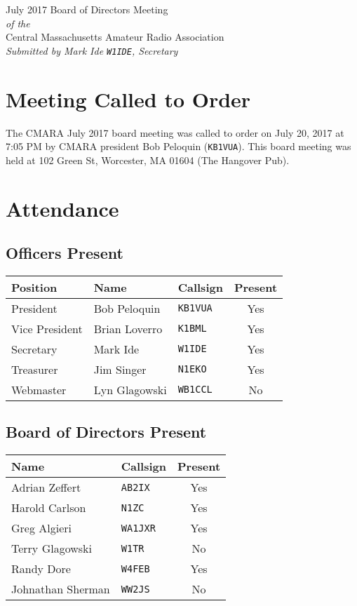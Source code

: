 \documentclass[10pt,letterpaper]{article}
\begin{document}
\begin{center}
{\huge July 2017 Board of Directors Meeting}\\
\emph{of the}\\
{\Large Central Massachusetts Amateur Radio Association}\\
\emph{Submitted by Mark Ide \texttt{W1IDE}, Secretary}
\end{center}

\section{Meeting Called to Order}
The CMARA July 2017 board meeting was called to order on July 20, 2017 at 7:05 PM by CMARA president Bob Peloquin (\texttt{KB1VUA}). This board meeting was held at 102 Green St, Worcester, MA 01604 (The Hangover Pub).

\section{Attendance}

\subsection{Officers Present}
\begin{tabular}{|l|l|l|c|}
  \hline
  \textbf{Position} & \textbf{Name}  & \textbf{Callsign} & \textbf{Present} \\ \hline
  President         & Bob Peloquin   & \texttt{KB1VUA}   & Yes \\
  Vice President    & Brian Loverro  & \texttt{K1BML}    & Yes \\
  Secretary         & Mark Ide       & \texttt{W1IDE}    & Yes \\
  Treasurer         & Jim Singer     & \texttt{N1EKO}    & Yes \\
  Webmaster         & Lyn Glagowski  & \texttt{WB1CCL}   & No \\
  \hline
\end{tabular}

\subsection{Board of Directors Present}
\begin{tabular}{|l|l|c|}
  \hline
  \textbf{Name}     & \textbf{Callsign} & \textbf{Present} \\ \hline
  Adrian Zeffert    & \texttt{AB2IX}    & Yes \\
  Harold Carlson    & \texttt{N1ZC}     & Yes \\
  Greg Algieri      & \texttt{WA1JXR}   & Yes \\
  Terry Glagowski   & \texttt{W1TR}     & No \\
  Randy Dore        & \texttt{W4FEB}    & Yes \\
  Johnathan Sherman & \texttt{WW2JS}    & No \\
  \hline
\end{tabular}
\end{document}
